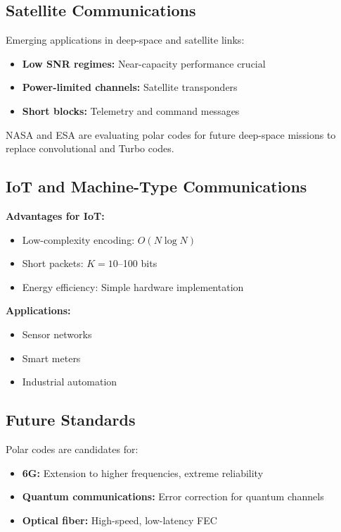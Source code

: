 \subsection{Satellite Communications}

Emerging applications in deep-space and satellite links:
\begin{itemize}
\item \textbf{Low SNR regimes:} Near-capacity performance crucial
\item \textbf{Power-limited channels:} Satellite transponders
\item \textbf{Short blocks:} Telemetry and command messages
\end{itemize}

NASA and ESA are evaluating polar codes for future deep-space missions to replace convolutional and Turbo codes.

\subsection{IoT and Machine-Type Communications}

\textbf{Advantages for IoT:}
\begin{itemize}
\item Low-complexity encoding: $O(N \log N)$
\item Short packets: $K = 10$--100 bits
\item Energy efficiency: Simple hardware implementation
\end{itemize}

\textbf{Applications:}
\begin{itemize}
\item Sensor networks
\item Smart meters
\item Industrial automation
\end{itemize}

\subsection{Future Standards}

Polar codes are candidates for:
\begin{itemize}
\item \textbf{6G:} Extension to higher frequencies, extreme reliability
\item \textbf{Quantum communications:} Error correction for quantum channels
\item \textbf{Optical fiber:} High-speed, low-latency FEC
\end{itemize}

